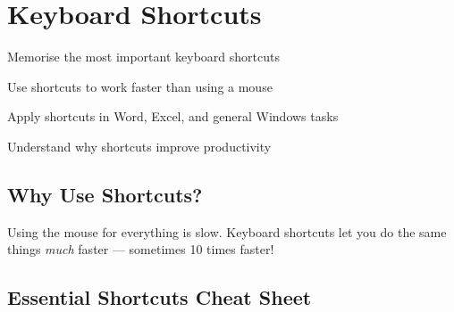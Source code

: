 
\chapter{Keyboard Shortcuts}
\label{ch:shortcuts}

\begin{objectives}
  \item Memorise the most important keyboard shortcuts
  \item Use shortcuts to work faster than using a mouse
  \item Apply shortcuts in Word, Excel, and general Windows tasks
  \item Understand why shortcuts improve productivity
\end{objectives}


\section{Why Use Shortcuts?}
\label{sec:why-shortcuts}

Using the mouse for everything is slow. Keyboard shortcuts let you do the same things \emph{much} faster --- sometimes 10 times faster!

\section{Essential Shortcuts Cheat Sheet}
\label{sec:shortcuts-cheat}

